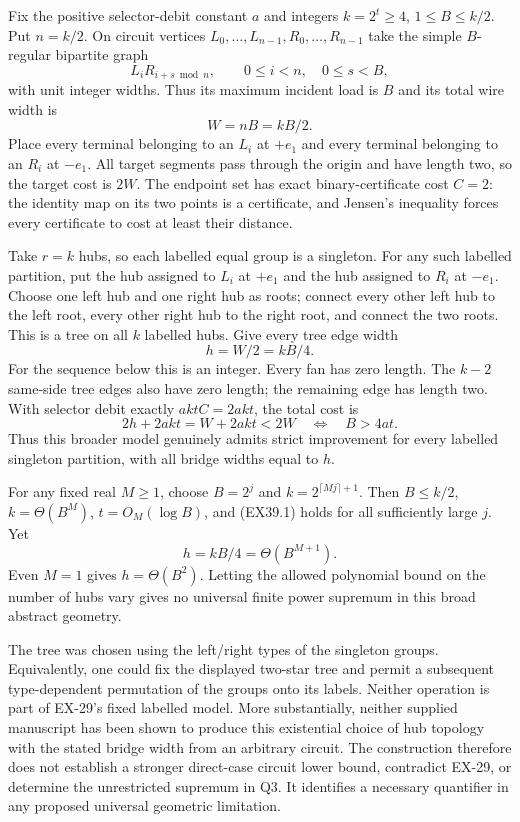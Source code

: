 Fix the positive selector-debit constant $a$ and integers
$k=2^t\ge4$, $1\le B\le k/2$. Put $n=k/2$. On circuit vertices
$L_0,\ldots,L_{n-1},R_0,\ldots,R_{n-1}$ take the simple
$B$-regular bipartite graph
\[
 L_iR_{i+s\bmod n},\qquad 0\le i<n,\quad0\le s<B,
\]
with unit integer widths. Thus its maximum incident load is $B$ and
its total wire width is
\[
 W=nB=kB/2.
\]
Place every terminal belonging to an $L_i$ at $+e_1$ and every
terminal belonging to an $R_i$ at $-e_1$. All target segments pass
through the origin and have length two, so the target cost is $2W$.
The endpoint set has exact binary-certificate cost $C=2$: the
identity map on its two points is a certificate, and Jensen's
inequality forces every certificate to cost at least their distance.

Take $r=k$ hubs, so each labelled equal group is a singleton.
For any such labelled partition, put the hub assigned to $L_i$ at
$+e_1$ and the hub assigned to $R_i$ at $-e_1$. Choose one left
hub and one right hub as roots; connect every other left hub to
the left root, every other right hub to the right root, and connect
the two roots. This is a tree on all $k$ labelled hubs. Give every
tree edge width
\[
 h=W/2=kB/4.
\]
For the sequence below this is an integer. Every fan has zero
length. The $k-2$ same-side tree edges also have zero length;
the remaining edge has length two. With selector debit exactly
$aktC=2akt$, the total cost is
\[
 2h+2akt=W+2akt<2W
 \quad\Longleftrightarrow\quad B>4at.
 \tag{EX39.1}
\]
Thus this broader model genuinely admits strict improvement for
every labelled singleton partition, with all bridge widths equal
to $h$.

For any fixed real $M\ge1$, choose
$B=2^j$ and $k=2^{\lceil Mj\rceil+1}$. Then $B\le k/2$,
$k=\Theta(B^M)$, $t=O_M(\log B)$, and (EX39.1) holds for all
sufficiently large $j$. Yet
\[
             h=kB/4=\Theta(B^{M+1}).
 \tag{EX39.2}
\]
Even $M=1$ gives $h=\Theta(B^2)$. Letting the allowed polynomial
bound on the number of hubs vary gives no universal finite power
supremum in this broad abstract geometry.

The tree was chosen using the left/right types of the singleton
groups. Equivalently, one could fix the displayed two-star tree
and permit a subsequent type-dependent permutation of the groups
onto its labels. Neither operation is part of EX-29's fixed labelled
model. More substantially, neither supplied manuscript has been
shown to produce this existential choice of hub topology with the
stated bridge width from an arbitrary circuit. The construction
therefore does not establish a stronger direct-case circuit lower
bound, contradict EX-29, or determine the unrestricted supremum in
Q3. It identifies a necessary quantifier in any proposed universal
geometric limitation.

